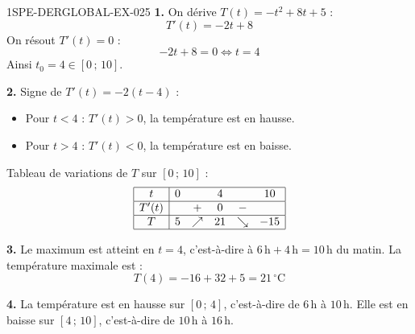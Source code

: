 \begin{corrige}{1SPE-DERGLOBAL-EX-025}
\textbf{1.} On dérive $T(t) = -t^2 + 8t + 5$ :
\[
T'(t) = -2t + 8
\]
On résout $T'(t) = 0$ :
\[
-2t + 8 = 0 \iff t = 4
\]
Ainsi $t_0 = 4 \in [0\,;\,10]$.

\textbf{2.} Signe de $T'(t) = -2(t - 4)$ :
\begin{itemize}
\item Pour $t < 4$ : $T'(t) > 0$, la température est en hausse.
\item Pour $t > 4$ : $T'(t) < 0$, la température est en baisse.
\end{itemize}

Tableau de variations de $T$ sur $[0\,;\,10]$ :
\[
\begin{array}{|c|ccccc|}
\hline
t & 0 & & 4 & & 10 \\
\hline
T'(t) & & + & 0 & - & \\
\hline
T & 5 & \nearrow & 21 & \searrow & -15 \\
\hline
\end{array}
\]

\textbf{3.} Le maximum est atteint en $t = 4$, c'est-à-dire à $6\,\text{h} + 4\,\text{h} = 10\,\text{h}$ du matin. La température maximale est :
\[
T(4) = -16 + 32 + 5 = \boxed{21\,^\circ\text{C}}
\]

\textbf{4.} La température est en hausse sur $[0\,;\,4]$, c'est-à-dire de $6\,\text{h}$ à $10\,\text{h}$. Elle est en baisse sur $[4\,;\,10]$, c'est-à-dire de $10\,\text{h}$ à $16\,\text{h}$.
\end{corrige}
